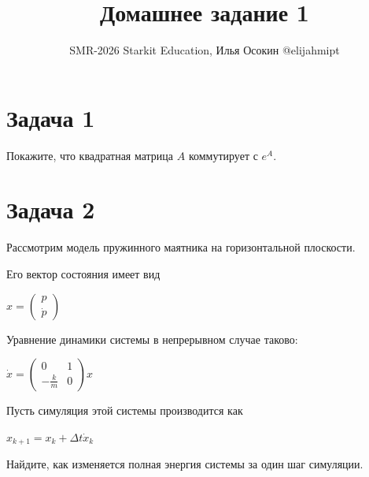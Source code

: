\documentclass{article}
\begin{document}
\title{Домашнее задание 1}
\date{}
\author{SMR-2026 Starkit Education, Илья Осокин @elijahmipt} %
\maketitle

\section*{Задача 1}

Покажите, что квадратная матрица $A$ коммутирует с $e^A$.

\section*{Задача 2}

\noindent Рассмотрим модель пружинного маятника на горизонтальной плоскости.

Его вектор состояния имеет вид

$x = \begin{pmatrix}
p \\
\dot{p} 
\end{pmatrix}$

Уравнение динамики системы в непрерывном случае таково:

$\dot{x} =  \begin{pmatrix}
0 & 1 \\
- \frac{k}{m} & 0 
\end{pmatrix} x$

Пусть симуляция этой системы производится как

$x_{k+1} = x_k + \Delta t \dot{x}_k$

Найдите, как изменяется полная энергия системы за один шаг симуляции.
\end{document}
